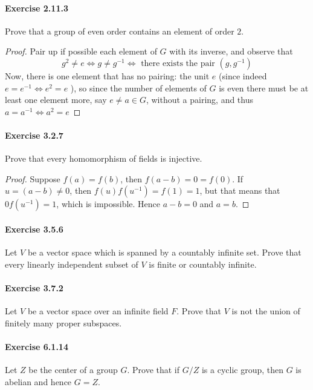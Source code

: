 \documentclass{article}
\begin{document}
\paragraph{Exercise 2.11.3} Prove that a group of even order contains an element of order $2 .$
\begin{proof}
    Pair up if possible each element of $G$ with its inverse, and observe that
$$
g^2 \neq e \Longleftrightarrow g \neq g^{-1} \Longleftrightarrow \text { there exists the pair }\left(g, g^{-1}\right)
$$
Now, there is one element that has no pairing: the unit $e$ (since indeed $e=e^{-1} \Longleftrightarrow e^2=e$ ), so since the number of elements of $G$ is even there must be at least one element more, say $e \neq a \in G$, without a pairing, and thus $a=a^{-1} \Longleftrightarrow a^2=e$
\end{proof}



\paragraph{Exercise 3.2.7} Prove that every homomorphism of fields is injective.
\begin{proof}
    Suppose $f(a)=f(b)$, then $f(a-b)=0=f(0)$. If $u=(a-b) \neq 0$, then $f(u) f\left(u^{-1}\right)=f(1)=1$, but that means that $0 f\left(u^{-1}\right)=1$, which is impossible. Hence $a-b=0$ and $a=b$.
\end{proof}



\paragraph{Exercise 3.5.6} Let $V$ be a vector space which is spanned by a countably infinite set. Prove that every linearly independent subset of $V$ is finite or countably infinite.


\paragraph{Exercise 3.7.2} Let $V$ be a vector space over an infinite field $F$. Prove that $V$ is not the union of finitely many proper subspaces.


\paragraph{Exercise 6.1.14} Let $Z$ be the center of a group $G$. Prove that if $G / Z$ is a cyclic group, then $G$ is abelian and hence $G=Z$.
\end{document}

